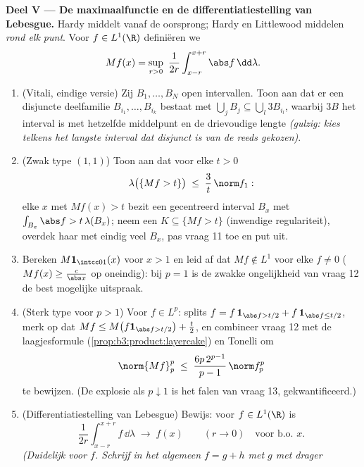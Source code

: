 \begin{problem}
\medskip
\noindent\textbf{Deel V --- De maximaalfunctie en de
differentiatiestelling van Lebesgue.} Hardy middelt vanaf de
oorsprong; Hardy en Littlewood middelen \emph{rond elk punt}.
Voor $f \in L^1(\R)$ definiëren we
\[
Mf(x) = \sup_{r>0}\ \frac1{2r}\int_{x-r}^{x+r}\abs
f\,\dd\lambda .
\]
\begin{enumerate}[resume]
  \item (Vitali, eindige versie) Zij $B_1, \dots, B_N$ open
        intervallen. Toon aan dat er een disjuncte deelfamilie
        $B_{i_1}, \dots, B_{i_k}$ bestaat met $\bigcup_jB_j
        \subseteq \bigcup_l3B_{i_l}$, waarbij $3B$ het interval
        is met hetzelfde middelpunt en de drievoudige lengte
        \emph{(gulzig: kies telkens het langste interval dat
        disjunct is van de reeds gekozen)}.
  \item (Zwak type $(1,1)$) Toon aan dat voor elke $t > 0$
        \[
        \lambda\bigl(\{Mf > t\}\bigr) \;\leq\;
        \frac3t\,\norm f_1 :
        \]
        elke $x$ met $Mf(x) > t$ bezit een gecentreerd interval
        $B_x$ met $\int_{B_x}\abs f > t\,\lambda(B_x)$; neem een
         $K \subseteq \{Mf > t\}$ (inwendige
        regulariteit), overdek haar met eindig veel $B_x$, pas
        vraag 11 toe en put uit.
  \item Bereken $M\mathbf 1_{\intcc01}(x)$ voor $x > 1$ en leid
        af dat $Mf \notin L^1$ voor elke $f \neq 0$ ($Mf(x) \geq
        \frac c{\abs x}$ op oneindig): bij $p = 1$ is de zwakke
        ongelijkheid van vraag 12 de best mogelijke uitspraak.
  \item (Sterk type voor $p > 1$) Voor $f \in L^p$: splits $f =
        f\,\mathbf 1_{\abs f > t/2} + f\,\mathbf 1_{\abs f
        \leq t/2}$, merk op dat $Mf \leq M\bigl(f\mathbf 1_{\abs
        f > t/2}\bigr) + \frac t2$, en combineer vraag 12 met de
        laagjesformule (\cref{prop:b3:product:layercake}) en
        Tonelli om
        \[
        \norm{Mf}_p^p \;\leq\;
        \frac{6p\,2^{p-1}}{p-1}\,\norm f_p^p
        \]
        te bewijzen. (De explosie als $p \downarrow 1$ is het
        falen van vraag 13, gekwantificeerd.)
  \item (Differentiatiestelling van Lebesgue) Bewijs: voor $f
        \in L^1(\R)$ is
        \[
        \frac1{2r}\int_{x-r}^{x+r}f\,\dd\lambda
        \;\longrightarrow\; f(x)
        \qquad (r \to 0)\quad\text{voor b.o.\ }x .
        \]
        \emph{(Duidelijk voor  $f$. Schrijf in het
        algemeen $f = g + h$ met $g$  met  drager
}
\end{enumerate}
\end{problem}

